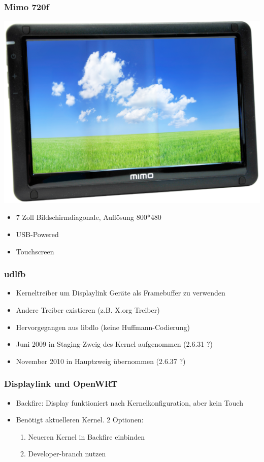 \documentclass{beamer}
\begin{document}
	\begin{frame}
		\frametitle{Mimo 720f}
		\begin{center}
			\includegraphics[scale=0.3]{img/mimo720f}
		\end{center}
		
		\begin{itemize}
			\item 7 Zoll Bildschirmdiagonale, Auflösung 800*480
			\item USB-Powered
			\item Touchscreen
		\end{itemize}
	\end{frame}

	\begin{frame}
		\frametitle{udlfb}
		\begin{itemize}
			\item Kerneltreiber um Displaylink Geräte als Framebuffer zu verwenden
			\item Andere Treiber existieren (z.B. X.org Treiber)
			\item Hervorgegangen aus libdlo (keine Huffmann-Codierung)
			\item Juni 2009 in Staging-Zweig des Kernel aufgenommen (2.6.31 ?)
			\item November 2010 in Hauptzweig übernommen (2.6.37 ?)
		\end{itemize}
	\end{frame}	
			
	\begin{frame}
		\frametitle{Displaylink und OpenWRT}
		\begin{itemize}
			\item Backfire: Display funktioniert nach Kernelkonfiguration, aber kein Touch
			\item Benötigt aktuelleren Kernel. 2 Optionen:
				\begin{enumerate}
					\item Neueren Kernel in Backfire einbinden
					\item Developer-branch nutzen
				\end{enumerate}
		\end{itemize}
	\end{frame}
\end{document}
